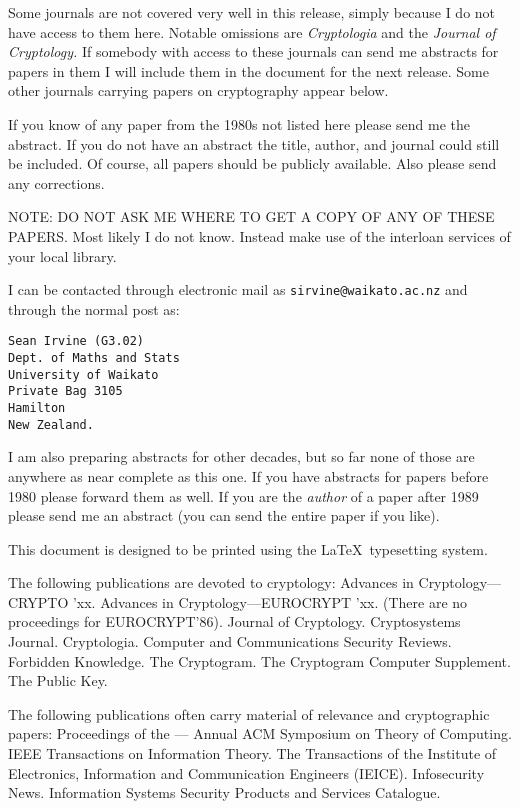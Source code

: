 Some journals are not covered very well in this release, simply because I do not have access to them here. Notable omissions are {\em Cryptologia\/} and the {\em Journal of Cryptology.} If somebody with access to these journals can send me abstracts for papers in them I will include them in the document for the next release. Some other journals carrying papers on cryptography appear below.

If you know of any paper from the 1980s not listed here please send me the abstract. If you do not have an abstract the title, author, and journal could still be included. Of course, all papers should be publicly available. Also please send any corrections.

NOTE: DO NOT ASK ME WHERE TO GET A COPY OF ANY OF THESE PAPERS. Most likely I do not know. Instead make use of the interloan services of your local library.

I can be contacted through electronic mail as {\tt sirvine@waikato.ac.nz} and through the normal post as:

\begin{verbatim}
Sean Irvine (G3.02)
Dept. of Maths and Stats
University of Waikato
Private Bag 3105
Hamilton
New Zealand.
\end{verbatim}

I am also preparing abstracts for other decades, but so far none of those are anywhere as near complete as this one. If you have abstracts for papers before 1980 please forward them as well. If you are the {\em author\/} of a paper after 1989 please send me an abstract (you can send the entire paper if you like).

This document is designed to be printed using the \LaTeX\ typesetting system.

The following publications are devoted to cryptology:
Advances in Cryptology---CRYPTO 'xx. Advances in Cryptology---EUROCRYPT 'xx. (There are no proceedings for EUROCRYPT'86). Journal of Cryptology. Cryptosystems Journal. Cryptologia. Computer and Communications Security Reviews. Forbidden Knowledge. The Cryptogram. The Cryptogram Computer Supplement. The Public Key.

The following publications often carry material of relevance and cryptographic papers: Proceedings of the --- Annual ACM Symposium on Theory of Computing. IEEE Transactions on Information Theory. The Transactions of the Institute of Electronics, Information and Communication Engineers (IEICE). Infosecurity News. Information Systems Security Products and Services Catalogue.


